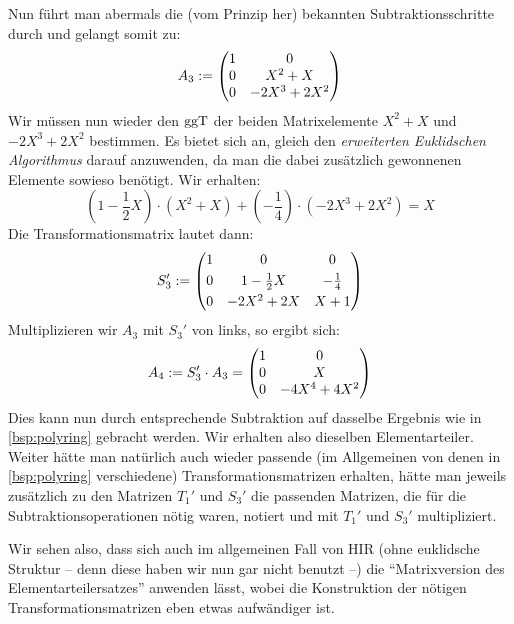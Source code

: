 \begin{thBeisp}
    Nun führt man abermals die (vom Prinzip her) bekannten Subtraktionsschritte
    durch und gelangt somit zu:
    \[ A_3 := \begin{pmatrix}   1 & 0     \\
                        0 & X^2+X \\
                        0 & -2X^3+2X^2  \end{pmatrix}   \]
    Wir müssen nun wieder den $\mathrm{ggT}$ der beiden Matrixelemente $X^2+X$ und
    $-2X^3+2X^2$ bestimmen. Es bietet sich an, gleich den \emph{erweiterten
    Euklidschen Algorithmus} darauf anzuwenden, da man die dabei zusätzlich
    gewonnenen Elemente sowieso benötigt. Wir erhalten:
    \[ \left( 1-\frac{1}{2}X \right) \cdot (X^2+X) + \left( -\frac{1}{4} \right)
        \cdot (-2X^3+2X^2) = X  \]
    Die Transformationsmatrix lautet dann:
    \[ S_3' := \begin{pmatrix}  1 & 0 & 0                           \\[3pt]
                        0 & 1-\frac{1}{2}X  & -\frac{1}{4}  \\[3pt]
                        0 & -2X^2+2X        & X+1                \end{pmatrix}   \]
    Multiplizieren wir $A_3$ mit $S_3'$ von links, so ergibt sich:
    \[ A_4 := S_3' \cdot A_3 
        = \begin{pmatrix}   1   &   0   \\
                    0   &   X   \\
                    0   & -4X^4+4X^2     \end{pmatrix}       \]
    Dies kann nun durch entsprechende Subtraktion auf dasselbe Ergebnis wie in
    \cref{bsp:polyring} gebracht werden. Wir erhalten also dieselben
    Elementarteiler. Weiter hätte man natürlich auch wieder passende
    (im Allgemeinen von denen in \cref{bsp:polyring} verschiedene)
    Transformationsmatrizen erhalten, hätte man jeweils zusätzlich zu den
    Matrizen $T_1'$ und $S_3'$ die passenden Matrizen, die für die
    Subtraktionsoperationen nötig waren, notiert und mit $T_1'$ und $S_3'$
    multipliziert.

    Wir sehen also, dass sich auch im allgemeinen Fall von HIR (ohne euklidsche
    Struktur -- denn diese haben wir nun gar nicht benutzt --) die
    \enquote{Matrixversion des Elementarteilersatzes} anwenden lässt, wobei die
    Konstruktion der nötigen Transformationsmatrizen eben etwas aufwändiger ist.
\end{thBeisp}












